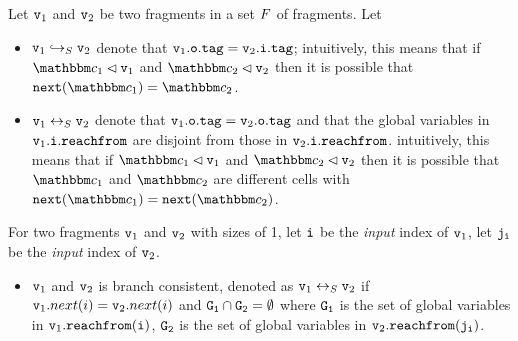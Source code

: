 Let $\mathtt{v}_1$ and $\mathtt{v}_2$ be two fragments in a set $F$ of fragments.
Let
\begin{itemize}
\item  $\mathtt{v}_1 \hookrightarrow_S \mathtt{v}_2$ denote that $\mathtt{v}_1.\mathtt{o}.\mathtt{tag} = \mathtt{v}_2.\mathtt{i}.\mathtt{tag}$;
  intuitively, this means that if
  $\cell_1 \lhd \frag_1$ and  $\cell_2 \lhd \frag_2$ then it is possible that
  $\mathtt{next}(\cell_1) = \cell_2$.
\item  $\mathtt{v}_1 \leftrightarrow_S \mathtt{v}_2$ denote that $\mathtt{v}_1.\mathtt{o}.\mathtt{tag} = \mathtt{v}_2.\mathtt{o}.\mathtt{tag}$ and that 
  the global variables in  $\mathtt{v}_1.\mathtt{i}.\mathtt{reachfrom}$ are disjoint from
  those in $\mathtt{v}_2.\mathtt{i}.\mathtt{reachfrom}$.
  intuitively, this means that if
  $\cell_1 \lhd \frag_1$ and  $\cell_2 \lhd \frag_2$ then it is possible that
  $\cell_1$ and $\cell_2$ are different cells with
  $\mathtt{next}(\cell_1) = \mathtt{next}(\cell_2)$.
\end{itemize}
For two fragments $\mathtt{v}_1$ and $\mathtt{v}_2$ with sizes of 1, let $\tt i$ be the {\em input} index of $\mathtt{v}_1$, let $\tt j_i$ be the {\em input} index of $\mathtt{v}_2$.
 \begin{itemize}
 \item $\mathtt{v}_1$ and $\mathtt{v}_2$ is branch consistent, denoted as $\mathtt{v}_1 \leftrightarrow_S \mathtt{v}_2$ if $\mathtt{v}_1.next(i) = \mathtt{v}_2.next(i)$ and $\tt G_1 \cap G_2 = \emptyset$ where $\tt G_1$ is the set of global variables in $\mathtt{v}_1.{\tt reachfrom}(\tt i)$,  $\tt G_2$ is the set of global variables in $\mathtt{v}_2.{\tt reachfrom}(\tt j_i)$.
 \end{itemize}

